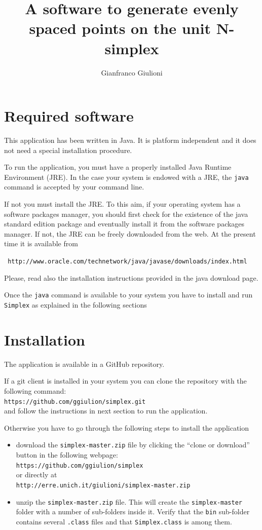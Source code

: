 \documentclass[12pt,a4paper]{article}
\title{A software to generate evenly spaced points on the unit N-simplex}
\author{Gianfranco Giulioni}
\begin{document}
\maketitle
\section*{Required software}
This application has been written in Java. It is platform independent and it does not need a special installation procedure. 

To run the application, you must have a properly installed Java Runtime Environment (JRE). In the case your system is endowed with a JRE, the \verb+java+ command is accepted by your command line. 

If not you must install the JRE. To this aim, if your operating system has a software packages manager, you should first check for the existence of the java standard edition package and eventually install it from the software packages manager. If not, the JRE can be freely downloaded from the web. At the present time it is available from 

\verb+ http://www.oracle.com/technetwork/java/javase/downloads/index.html +

Please, read also the installation instructions provided in the java download page.

Once the \verb+java+ command is available to your system you have to install and run \verb+Simplex+ as explained in the following sections


\section*{Installation}
The application is available in a GitHub repository.

If a git client is installed in your system you can clone the repository with the following command:\\
\verb+https://github.com/ggiulion/simplex.git+\\
and follow the instructions in next section to run the application.

Otherwise you have to go through the following steps to install the application


\begin{itemize}
\item download the \verb+simplex-master.zip+ file by clicking the ``clone or download'' button in the following webpage:\\
\verb+https://github.com/ggiulion/simplex+\\
or directly at\\
\verb+http://erre.unich.it/giulioni/simplex-master.zip+
\item unzip the \verb+simplex-master.zip+ file. This will create the \verb+simplex-master+ folder with a number of sub-folders inside it. Verify that the \verb+bin+ sub-folder contains several \verb+.class+ files and that  \verb+Simplex.class+ is among them.
\end{itemize}
\end{document}
